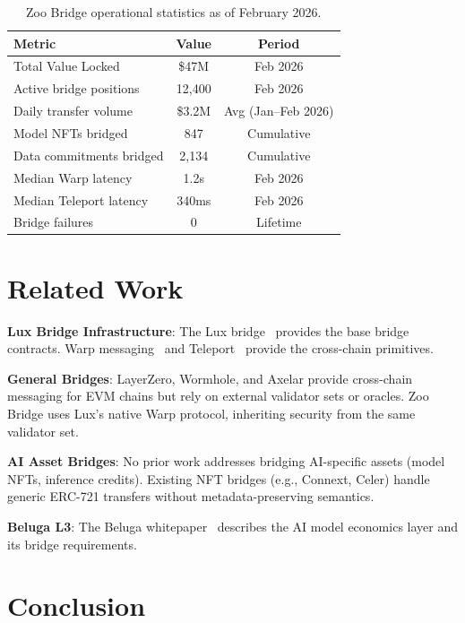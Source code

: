 \documentclass[11pt,letterpaper]{article}
\begin{document}
\begin{table}[t]
\centering
\begin{tabular}{lcc}
\toprule
\textbf{Metric} & \textbf{Value} & \textbf{Period} \\
\midrule
Total Value Locked & \$47M & Feb 2026 \\
Active bridge positions & 12,400 & Feb 2026 \\
Daily transfer volume & \$3.2M & Avg (Jan--Feb 2026) \\
Model NFTs bridged & 847 & Cumulative \\
Data commitments bridged & 2,134 & Cumulative \\
Median Warp latency & 1.2s & Feb 2026 \\
Median Teleport latency & 340ms & Feb 2026 \\
Bridge failures & 0 & Lifetime \\
\bottomrule
\end{tabular}
\caption{Zoo Bridge operational statistics as of February 2026.}
\label{tab:stats}
\end{table}

\section{Related Work}

\textbf{Lux Bridge Infrastructure}: The Lux bridge~\cite{lux-bridge} provides the base bridge contracts. Warp messaging~\cite{lux-warp-messaging} and Teleport~\cite{lux-teleport-protocol} provide the cross-chain primitives.

\textbf{General Bridges}: LayerZero, Wormhole, and Axelar provide cross-chain messaging for EVM chains but rely on external validator sets or oracles. Zoo Bridge uses Lux's native Warp protocol, inheriting security from the same validator set.

\textbf{AI Asset Bridges}: No prior work addresses bridging AI-specific assets (model NFTs, inference credits). Existing NFT bridges (e.g., Connext, Celer) handle generic ERC-721 transfers without metadata-preserving semantics.

\textbf{Beluga L3}: The Beluga whitepaper~\cite{beluga-l3-whitepaper} describes the AI model economics layer and its bridge requirements.

\section{Conclusion}
\end{document}
